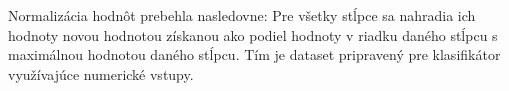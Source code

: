 \documentclass[a4paper, 16pt]{article}
\begin{document}
\bigskip
Normalizácia hodnôt prebehla nasledovne: Pre všetky stĺpce sa nahradia ich hodnoty novou hodnotou získanou ako podiel hodnoty v riadku daného stĺpcu s maximálnou hodnotou daného stĺpcu. Tím je dataset pripravený pre klasifikátor využívajúce numerické vstupy.
%
%
\end{document}
